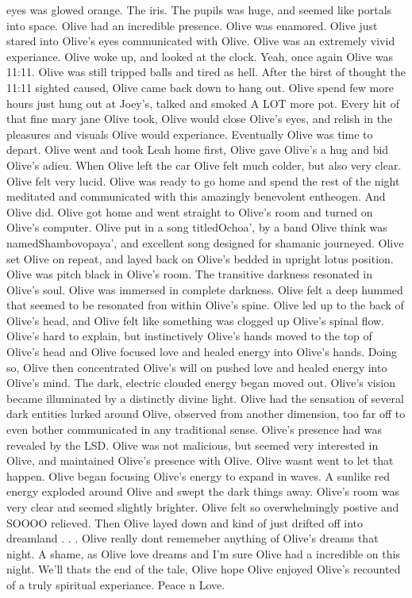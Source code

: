 \documentclass[12pt]{book}
\begin{document}
eyes was glowed orange. The iris. The pupils was huge, and seemed like portals into space. Olive had an incredible presence. Olive was enamored. Olive just stared into Olive's eyes communicated with Olive. Olive was an extremely vivid experiance. Olive woke up, and looked at the clock. Yeah, once again Olive was 11:11. Olive was still tripped balls and tired as hell. After the birst of thought the 11:11 sighted caused, Olive came back down to hang out. Olive spend few more hours just hung out at Joey's, talked and smoked A LOT more pot. Every hit of that fine mary jane Olive took, Olive would close Olive's eyes, and relish in the pleasures and visuals Olive would experiance. Eventually Olive was time to depart. Olive went and took Leah home first, Olive gave Olive's a hug and bid Olive's adieu. When Olive left the car Olive felt much colder, but also very clear. Olive felt very lucid. Olive was ready to go home and spend the rest of the night meditated and communicated with this amazingly benevolent entheogen. And Olive did. Olive got home and went straight to Olive's room and turned on Olive's computer. Olive put in a song titledOchoa', by a band Olive think was namedShambovopaya', and excellent song designed for shamanic journeyed. Olive set Olive on repeat, and layed back on Olive's bedded in upright lotus position. Olive was pitch black in Olive's room. The transitive darkness resonated in Olive's soul. Olive was immersed in complete darkness. Olive felt a deep hummed that seemed to be resonated fron within Olive's spine. Olive led up to the back of Olive's head, and Olive felt like something was clogged up Olive's spinal flow. Olive's hard to explain, but instinctively Olive's hands moved to the top of Olive's head and Olive focused love and healed energy into Olive's hands. Doing so, Olive then concentrated Olive's will on pushed love and healed energy into Olive's mind. The dark, electric clouded energy began moved out. Olive's vision became illuminated by a distinctly divine light. Olive had the sensation of several dark entities lurked around Olive, observed from another dimension, too far off to even bother communicated in any traditional sense. Olive's presence had was revealed by the LSD. Olive was not malicious, but seemed very interested in Olive, and maintained Olive's presence with Olive. Olive wasnt went to let that happen. Olive began focusing Olive's energy to expand in waves. A sunlike red energy exploded around Olive and swept the dark things away. Olive's room was very clear and seemed slightly brighter. Olive felt so overwhelmingly postive and SOOOO relieved. Then Olive layed down and kind of just drifted off into dreamland . . .  Olive really dont rememeber anything of Olive's dreams that night. A shame, as Olive love dreams and I'm sure Olive had a incredible on this night. We'll thats the end of the tale, Olive hope Olive enjoyed Olive's recounted of a truly spiritual experiance. Peace n Love.
\end{document}
